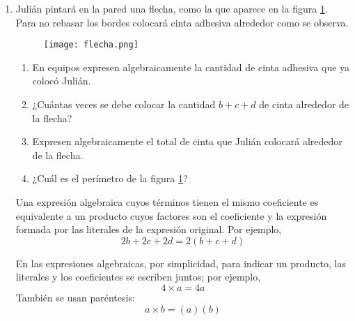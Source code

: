 \begin{enumerate}
    \item Julián pintará en la pared una flecha, como la que aparece en la figura \ref{fig:flecha}.
          Para no rebasar los bordes colocará cinta adhesiva alrededor como se observa.

          \begin{minipage}[t]{0.3\textwidth}
              \begin{figure}[H]
                  \centering
                  \texttt{[image: flecha.png]}
                  \label{fig:flecha}
              \end{figure}
          \end{minipage}\hfill
          \begin{minipage}[t]{0.7\textwidth}
              \begin{enumerate}
                  \item En equipos expresen algebraicamente la cantidad de cinta adhesiva que ya colocó Julián.
                  \item ¿Cuántas veces se debe colocar la cantidad $b + c + d$ de cinta alrededor de la flecha?
                  \item Expresen algebraicamente el total de cinta que Julián colocará alrededor de la flecha.
                  \item ¿Cuál es el perímetro de la figura \ref{fig:flecha}?
              \end{enumerate}
          \end{minipage}

          \begin{boxH}
              Una expresión algebraica cuyos términos tienen el mismo coeficiente es
              equivalente a un producto cuyos factores son el coeficiente y la expresión formada por
              las literales de la expresión original. Por ejemplo,
              \[ 2b + 2c + 2d = 2(b + c + d)\]
          \end{boxH}

          \begin{boxE}
              En las expresiones algebraicas, por simplicidad, para indicar un producto, las literales y los
              coeficientes se escriben juntos; por ejemplo,\\
              \[ 4 \times a = 4a \]
              También se usan paréntesis:\\
              \[ a \times b = (a) (b)\]
          \end{boxE}


\end{enumerate}

